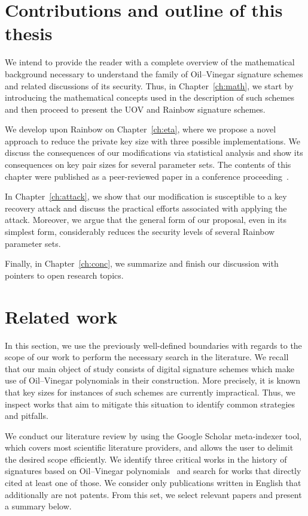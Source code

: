 \documentclass[12pt, a4paper, oneside]{memoir}
\theoremstyle{definition}
\begin{document}
\section{Contributions and outline of this thesis}

We intend to provide the reader with a complete overview of the mathematical background necessary to understand the family of Oil--Vinegar signature schemes and related discussions of its security. Thus, in Chapter~\ref{ch:math}, we start by introducing the mathematical concepts used in the description of such schemes and then proceed to present the UOV and Rainbow signature schemes.

We develop upon Rainbow on Chapter~\ref{ch:eta}, where we propose a novel approach to reduce the private key size with three possible implementations. We discuss the consequences of our modifications via statistical analysis and show its consequences on key pair sizes for several parameter sets. The contents of this chapter were published as a peer-reviewed paper in a conference proceeding~\cite{Zambonin:201907}.

In Chapter~\ref{ch:attack}, we show that our modification is susceptible to a key recovery attack and discuss the practical efforts associated with applying the attack. Moreover, we argue that the general form of our proposal, even in its simplest form, considerably reduces the security levels of several Rainbow parameter sets.

Finally, in Chapter~\ref{ch:conc}, we summarize and finish our discussion with pointers to open research topics.

\section{Related work}\label{sec:related}

In this section, we use the previously well-defined boundaries with regards to the scope of our work to perform the necessary search in the literature. We recall that our main object of study consists of digital signature schemes which make use of Oil--Vinegar polynomials in their construction. More precisely, it is known that key sizes for instances of such schemes are currently impractical. Thus, we inspect works that aim to mitigate this situation to identify common strategies and pitfalls.

We conduct our literature review by using the Google Scholar meta-indexer tool, which covers most scientific literature providers, and allows the user to delimit the desired scope efficiently. We identify three critical works in the history of signatures based on Oil--Vinegar polynomials~\cite{Patarin:199709,Kipnis:199904,Ding:200506} and search for works that directly cited at least one of those. We consider only publications written in English that additionally are not patents. From this set, we select relevant papers and present a summary below.
\end{document}
